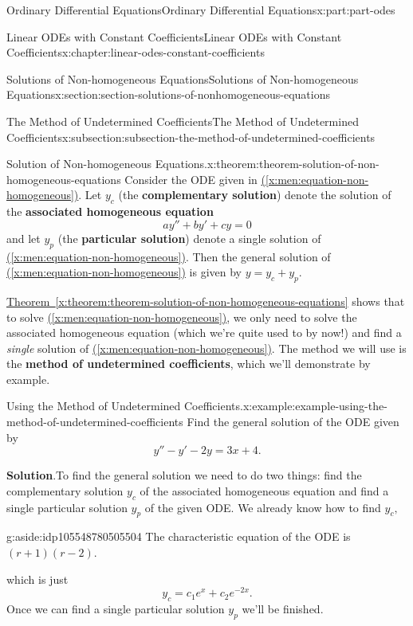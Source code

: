 \documentclass[oneside,10pt,]{book}
\newcommand{\blocktitlefont}{\relax}
\newcommand{\xreffont}{\relax}
\newcommand{\terminology}[1]{\textbf{#1}}
\numberwithin{equation}{part}
\begin{document}
\begin{partptx}{Ordinary Differential Equations}{}{Ordinary Differential Equations}{}{}{x:part:part-odes}
\begin{chapterptx}{Linear ODEs with Constant Coefficients}{}{Linear ODEs with Constant Coefficients}{}{}{x:chapter:linear-odes-constant-coefficients}
\begin{sectionptx}{Solutions of Non-homogeneous Equations}{}{Solutions of Non-homogeneous Equations}{}{}{x:section:section-solutions-of-nonhomogeneous-equations}
\begin{subsectionptx}{The Method of Undetermined Coefficients}{}{The Method of Undetermined Coefficients}{}{}{x:subsection:subsection-the-method-of-undetermined-coefficients}
\begin{theorem}{Solution of Non-homogeneous Equations.}{}{x:theorem:theorem-solution-of-non-homogeneous-equations}
Consider the ODE given in \hyperref[x:men:equation-non-homogeneous]{({\xreffont\ref{x:men:equation-non-homogeneous}})}. Let \(y_{c}\) (the \terminology{complementary solution}) denote the solution of the \terminology{associated homogeneous equation}%
\begin{equation*}
ay'' + by' + cy = 0
\end{equation*}
and let \(y_{p}\) (the \terminology{particular solution}) denote a single solution of \hyperref[x:men:equation-non-homogeneous]{({\xreffont\ref{x:men:equation-non-homogeneous}})}. Then the general solution of \hyperref[x:men:equation-non-homogeneous]{({\xreffont\ref{x:men:equation-non-homogeneous}})} is given by \(y = y_{c} + y_{p}\).%
\end{theorem}
\hyperref[x:theorem:theorem-solution-of-non-homogeneous-equations]{Theorem~{\xreffont\ref{x:theorem:theorem-solution-of-non-homogeneous-equations}}} shows that to solve \hyperref[x:men:equation-non-homogeneous]{({\xreffont\ref{x:men:equation-non-homogeneous}})}, we only need to solve the associated homogeneous equation (which we're quite used to by now!) and find a \emph{single} solution of \hyperref[x:men:equation-non-homogeneous]{({\xreffont\ref{x:men:equation-non-homogeneous}})}. The method we will use is the \terminology{method of undetermined coefficients}, which we'll demonstrate by example.%
\begin{example}{Using the Method of Undetermined Coefficients.}{x:example:example-using-the-method-of-undetermined-coefficients}%
Find the general solution of the ODE given by%
\begin{equation*}
y'' - y' - 2y = 3x + 4.
\end{equation*}
%
\par\smallskip%
\noindent\textbf{\blocktitlefont Solution}.\hypertarget{g:solution:idp105548780504096}{}\quad{}To find the general solution we need to do two things: find the complementary solution \(y_{c}\) of the associated homogeneous equation and find a single particular solution \(y_{p}\) of the given ODE. We already know how to find \(y_{c},\)\begin{aside}{}{g:aside:idp105548780505504}%
The characteristic equation of the ODE is \((r + 1)(r - 2)\).%
\end{aside}
 which is just%
\begin{equation*}
y_{c} = c_{1}e^{x} + c_{2}e^{-2x}.
\end{equation*}
Once we can find a single particular solution \(y_{p}\) we'll be finished.%

\end{example}
\end{subsectionptx}
\end{sectionptx}
\end{chapterptx}
\end{partptx}
\end{document}

